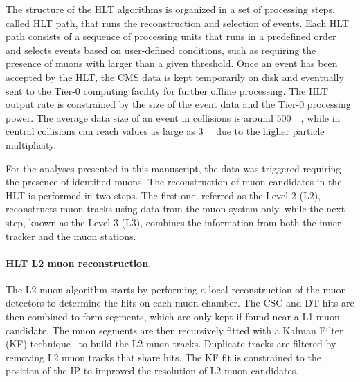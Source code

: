 The structure of the HLT algorithms is organized in a set of processing steps, called HLT path, that runs the reconstruction and selection of events. Each HLT path consists of a sequence of processing units that runs in a predefined order and selects events based on user-defined conditions, such as requiring the presence of muons with \pt larger than a given threshold. Once an event has been accepted by the HLT, the CMS data is kept temporarily on disk and eventually sent to the Tier-0 computing facility for further offline processing. The HLT output rate is constrained by the size of the event data and the Tier-0 processing power. The average data size of an event in \Runpp collisions is around \SI{500}{\kilo\Bit}, while in central \RunPbPb collisions can reach values as large as \SI{3}{\mega\Bit} due to the higher particle multiplicity.

For the analyses presented in this manuscript, the data was triggered requiring the presence of identified muons. The reconstruction of muon candidates in the HLT is performed in two steps. The first one, referred as the Level-2 (L2), reconstructs muon tracks using data from the muon system only, while the next step, known as the Level-3 (L3), combines the information from both the inner tracker and the muon stations.

\paragraph{HLT L2 muon reconstruction.} The L2 muon algorithm starts by performing a local reconstruction of the muon detectors to determine the hits on each muon chamber. The CSC and DT hits are then combined to form segments, which are only kept if found near a L1 muon candidate. The muon segments are then recursively fitted with a Kalman Filter (KF) technique~\cite{KalmanFilter} to build the L2 muon tracks. Duplicate tracks are filtered by removing L2 muon tracks that share hits. The KF fit is constrained to the position of the IP to improved the \pt resolution of L2 muon candidates.

